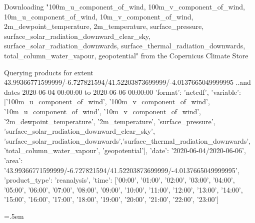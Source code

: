 \documentclass[a4paper,11pt]{article}
\newenvironment{cverbatim}
 {\SaveVerbatim{cverb}}
 {\endSaveVerbatim
  \flushleft\fboxrule=0pt\fboxsep=.5em
  \colorbox{bg}{\BUseVerbatim{cverb}}%
  \endflushleft
}
\begin{document}
\begin{enumerate}
{\begin{cverbatim}
Downloading "100m_u_component_of_wind, 100m_v_component_of_wind, 
10m_u_component_of_wind, 10m_v_component_of_wind, 
2m_dewpoint_temperature, 2m_temperature, surface_pressure, 
surface_solar_radiation_downward_clear_sky, 
surface_solar_radiation_downwards, surface_thermal_radiation_downwards, 
total_column_water_vapour, geopotential" 
from the Copernicus Climate Store

Querying products for extent 43.99366771599999/-6.727821594/41.52203873699999/-4.0137665049999995
..and dates 2020-06-04 00:00:00 to 2020-06-06 00:00:00
{'format': 'netcdf', 
'variable': ['100m_u_component_of_wind', '100m_v_component_of_wind', 
'10m_u_component_of_wind', '10m_v_component_of_wind', 
'2m_dewpoint_temperature', '2m_temperature', 'surface_pressure', 
'surface_solar_radiation_downward_clear_sky',
'surface_solar_radiation_downwards','surface_thermal_radiation_downwards',
'total_column_water_vapour', 'geopotential'], 
'date': '2020-06-04/2020-06-06', 
'area': '43.99366771599999/-6.727821594/41.52203873699999/-4.0137665049999995', 
'product_type': 'reanalysis', 
'time': ['00:00', '01:00', '02:00', '03:00', '04:00', '05:00', '06:00', '07:00',
'08:00', '09:00', '10:00', '11:00', '12:00', '13:00', '14:00', '15:00', '16:00', 
'17:00', '18:00', '19:00', '20:00', '21:00', '22:00', '23:00']}


\end{cverbatim}}
\end{enumerate}
\end{document}

